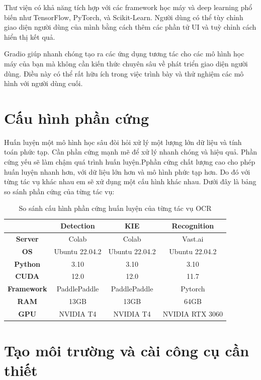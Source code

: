 Thư viện có khả năng tích hợp với các framework học máy và deep learning phổ biến như TensorFlow, PyTorch, và Scikit-Learn. Người dùng có thể tùy chỉnh giao diện người dùng của mình bằng cách thêm các phần tử UI và tuỳ chỉnh cách hiển thị kết quả.

Gradio giúp nhanh chóng tạo ra các ứng dụng tương tác cho các mô hình học máy của bạn mà không cần kiến thức chuyên sâu về phát triển giao diện người dùng. Điều này có thể rất hữu ích trong việc trình bày và thử nghiệm các mô hình với người dùng cuối.

\section{Cấu hình phần cứng}
Huấn luyện một mô hình học sâu đòi hỏi xử lý một lượng lớn dữ liệu và tính toán phức tạp. Cần phần cứng mạnh mẽ để xử lý nhanh chóng và hiệu quả. Phần cứng yếu sẽ làm chậm quá trình huấn luyện.Pphần cứng chất lượng cao cho phép huấn luyện nhanh hơn, với dữ liệu lớn hơn và mô hình phức tạp hơn. Do đó với từng tác vụ khác nhau em sẽ xử dụng một cấu hình khác nhau. Dưới đây là bảng so sánh phần cứng của từng tác vụ:

\begin{table}[h]
    \centering
    \begin{tabular}{| c | c | c | c |} 
     \hline
               & \textbf{Detection} & \textbf{KIE} & \textbf{Recognition} \\
     \hline\hline
     \textbf{Server}    & Colab & Colab & Vast.ai \\ 
     \textbf{OS}        & Ubuntu 22.04.2 & Ubuntu 22.04.2 & Ubuntu 22.04.2 \\
     \textbf{Python}    & 3.10 & 3.10 & 3.10 \\
     \textbf{CUDA}      & 12.0 & 12.0 & 11.7 \\
     \textbf{Framework} & PaddlePaddle & PaddlePaddle & Pytorch     \\
     \textbf{RAM}       & 13GB & 13GB & 64GB     \\
     \textbf{GPU}       & NVIDIA T4 & NVIDIA T4 & NVIDIA RTX 3060\\
     \hline
    \end{tabular}
    \caption{So sánh cấu hình phần cứng huấn luyện của từng tác vụ OCR}
    \label{table:hardward}
\end{table}

\section{Tạo môi trường và cài công cụ cần thiết}
